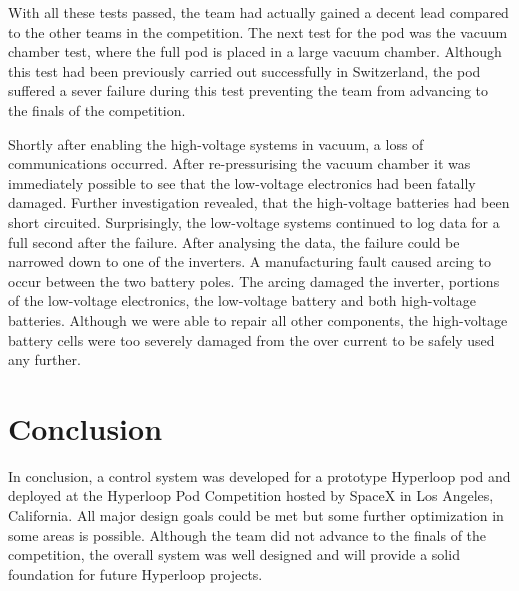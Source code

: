 With all these tests passed, the team had actually gained a decent lead compared to the other teams in the competition. The next test for the pod was the vacuum chamber test, where the full pod is placed in a large vacuum chamber. Although this test had been previously carried out successfully in Switzerland, the pod suffered a sever failure during this test preventing the team from advancing to the finals of the competition.

Shortly after enabling the high-voltage systems in vacuum, a loss of communications occurred. After re-pressurising the vacuum chamber it was immediately possible to see that the low-voltage electronics had been fatally damaged. Further investigation revealed, that the high-voltage batteries had been short circuited. Surprisingly, the low-voltage systems continued to log data for a full second after the failure. After analysing the data, the failure could be narrowed down to one of the inverters. A manufacturing fault caused arcing to occur between the two battery poles. The arcing damaged the inverter, portions of the low-voltage electronics, the low-voltage battery and both high-voltage batteries. Although we were able to repair all other components, the high-voltage battery cells were too severely damaged from the over current to be safely used any further.

\section{Conclusion}

In  conclusion, a control system was developed for a prototype Hyperloop pod and deployed at the Hyperloop Pod Competition hosted by SpaceX in Los Angeles, California. All major design goals could be met but some further optimization in some areas is possible. Although the team did not advance to the finals of the competition, the overall system was well designed and will provide a solid foundation for future Hyperloop projects.





